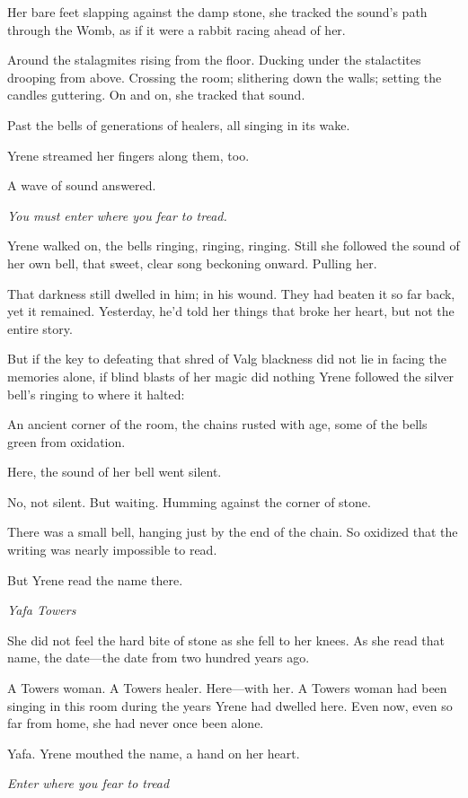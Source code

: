 Her bare feet slapping against the damp stone, she tracked the sound's path through the Womb, as if it were a rabbit racing ahead of her.

Around the stalagmites rising from the floor. Ducking under the stalactites drooping from above. Crossing the room; slithering down the walls; setting the candles guttering. On and on, she tracked that sound.

Past the bells of generations of healers, all singing in its wake.

Yrene streamed her fingers along them, too.

A wave of sound answered.

\emph{You must enter where you fear to tread.}

Yrene walked on, the bells ringing, ringing, ringing. Still she followed the sound of her own bell, that sweet, clear song beckoning onward. Pulling her.

That darkness still dwelled in him; in his wound. They had beaten it so far back, yet it remained. Yesterday, he'd told her things that broke her heart, but not the entire story.

But if the key to defeating that shred of Valg blackness did not lie in facing the memories alone, if blind blasts of her magic did nothing
 Yrene followed the silver bell's ringing to where it halted:

An ancient corner of the room, the chains rusted with age, some of the bells green from oxidation.

Here, the sound of her bell went silent.

No, not silent. But waiting. Humming against the corner of stone.

There was a small bell, hanging just by the end of the chain. So oxidized that the writing was nearly impossible to read.

But Yrene read the name there.

\emph{Yafa Towers}

She did not feel the hard bite of stone as she fell to her knees. As she read that name, the date---the date from two hundred years ago.

A Towers woman. A Towers healer. Here---with her. A Towers woman had been singing in this room during the years Yrene had dwelled here. Even now, even so far from home, she had never once been alone.

Yafa. Yrene mouthed the name, a hand on her heart.

\emph{Enter where you fear to tread }

